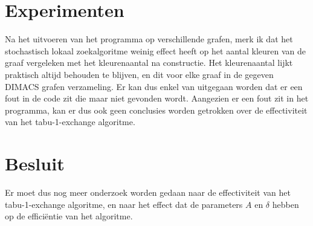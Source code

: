 \documentclass[a4paper,kulak]{kulakarticle} %
\begin{document}
\section{Experimenten}

Na het uitvoeren van het programma op verschillende grafen, merk ik dat het stochastisch lokaal zoekalgoritme weinig effect heeft op het aantal kleuren van de graaf vergeleken met het kleurenaantal na constructie. Het kleurenaantal lijkt praktisch altijd behouden te blijven, en dit voor elke graaf in de gegeven DIMACS grafen verzameling. Er kan dus enkel van uitgegaan worden dat er een fout in de code zit die maar niet gevonden wordt. Aangezien er een fout zit in het programma, kan er dus ook geen conclusies worden getrokken over de effectiviteit van het tabu-1-exchange algoritme.

\section*{Besluit}

Er moet dus nog meer onderzoek worden gedaan naar de effectiviteit van het tabu-1-exchange algoritme, en naar het effect dat de parameters $A$ en $\delta$ hebben op de efficiëntie van het algoritme.
\end{document}
